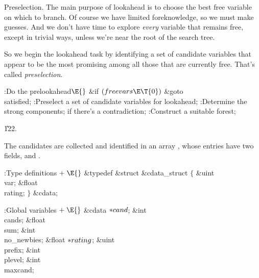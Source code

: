 Preselection. The main purpose of lookahead is to choose the best
free variable on which to branch. Of course we have limited foreknowledge,
so we must make guesses. And we don't have time to explore {\it every\/}
variable that remains free, except in trivial ways, unless
we're near the root of the search tree.

So we begin the lookahead task by identifying a set of candidate
variables that appear to be the most promising among all those that
are currently free. That's called {\it preselection}.

\Y\B\4:Do the prelookahead\X${}\E{}$\6
\&{if} ${}(\\{freevars}\E\T{0}){}$\1\5
\&{goto} \\{satisfied};\2\6
:Preselect a set of candidate variables for lookahead\X;\6
:Determine the strong components;  if there's a
contradiction\X;\6
:Construct a suitable forest\X;\par
\U122.\fi

The candidates are collected and identified in an array ,
whose
entries have two fields,  and .

\Y\B\4:Type definitions\X${}\mathrel+\E{}$\6
\&{typedef} \&{struct} \&{cdata\_struct} ${}\{{}$\1\6
\&{uint} \\{var};\6
\&{float} \\{rating};\2\6
${}\}{}$ \&{cdata};\par
\fi

\B{}:Global variables\X${}\mathrel+\E{}$\6
\&{cdata} ${}{*}\\{cand}{}$;\6
\&{int} \\{cands};\6
\&{float} \\{sum};\6
\&{int} \\{no\_newbies};\6
\&{float} ${}{*}\\{rating}{}$;\6
\&{uint} \\{prefix};\6
\&{int} \\{plevel};\6
\&{int} \\{maxcand};\par
\fi

